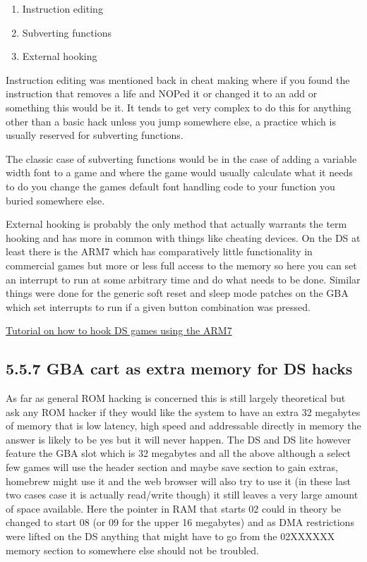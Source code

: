 \documentclass[
]{book}
\providecommand{\tightlist}{%
  \setlength{\itemsep}{0pt}\setlength{\parskip}{0pt}}
\begin{document}
\begin{enumerate}
\def\labelenumi{\arabic{enumi}.}
\tightlist
\item
  Instruction editing
\item
  Subverting functions
\item
  External hooking
\end{enumerate}

Instruction editing was mentioned back in cheat making where if you found the instruction that removes a life and NOPed it or changed it to an add or something this would be it. It tends to get very complex to do this for anything other than a basic hack unless you jump somewhere else, a practice which is usually reserved for subverting functions.

The classic case of subverting functions would be in the case of adding a variable width font to a game and where the game would usually calculate what it needs to do you change the games default font handling code to your function you buried somewhere else.

External hooking is probably the only method that actually warrants the term hooking and has more in common with things like cheating devices. On the DS at least there is the ARM7 which has comparatively little functionality in commercial games but more or less full access to the memory so here you can set an interrupt to run at some arbitrary time and do what needs to be done. Similar things were done for the generic soft reset and sleep mode patches on the GBA which set interrupts to run if a given button combination was pressed.

\href{https://web.archive.org/web/20110810025458/http://crackerscrap.com/docs/dshooking.html}{Tutorial on how to hook DS games using the ARM7}

\hypertarget{gba-cart-as-extra-memory-for-ds-hacks}{%
\subsection{5.5.7 GBA cart as extra memory for DS hacks}\label{gba-cart-as-extra-memory-for-ds-hacks}}

As far as general ROM hacking is concerned this is still largely theoretical but ask any ROM hacker if they would like the system to have an extra 32 megabytes of memory that is low latency, high speed and addressable directly in memory the answer is likely to be yes but it will never happen. The DS and DS lite however feature the GBA slot which is 32 megabytes and all the above although a select few games will use the header section and maybe save section to gain extras, homebrew might use it and the web browser will also try to use it (in these last two cases case it is actually read/write though) it still leaves a very large amount of space available. Here the pointer in RAM that starts 02 could in theory be changed to start 08 (or 09 for the upper 16 megabytes) and as DMA restrictions were lifted on the DS anything that might have to go from the 02XXXXXX memory section to somewhere else should not be troubled.
\end{document}
